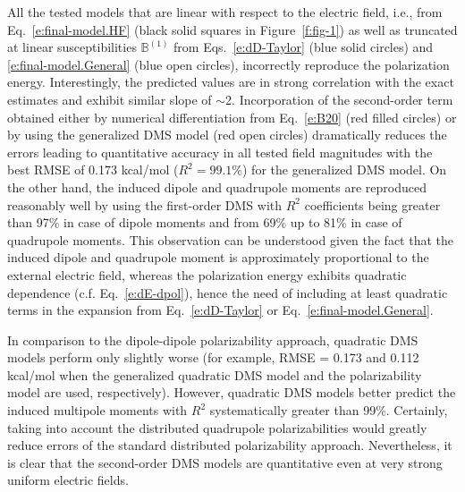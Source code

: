 \documentclass[aip,jcp,preprint,amsmath,amssymb,floatfix]{revtex4-1}
\begin{document}
All the tested models that are linear with respect to the electric field,
i.e., from Eq.~\eqref{e:final-model.HF} (black solid squares in Figure~\ref{f:fig-1}) 
as well as truncated at linear susceptibilities $\mathbb{B}^{(1)}$ 
from Eqs.~\eqref{e:dD-Taylor} (blue solid circles) and \eqref{e:final-model.General} (blue open circles),
incorrectly reproduce the polarization energy.
Interestingly, the predicted values are in strong
correlation with the exact estimates and exhibit similar slope of $\sim$2.
Incorporation of the second\hyp{}order term
obtained either by numerical differentiation from Eq.~\eqref{e:B20} (red filled circles) 
or by using the generalized DMS model (red open circles)
dramatically reduces the errors
leading to quantitative accuracy in all tested field magnitudes 
with the best RMSE of 0.173 kcal/mol ($R^2=99.1\%$) for the generalized DMS model.
On the other hand, the
induced dipole and quadrupole moments are reproduced reasonably well by
using the first\hyp{}order DMS with $R^2$ coefficients being 
greater than 97\% in case of dipole moments and from 69\% up to 81\% in case of quadrupole moments.
This observation can be understood given the fact that the induced dipole
and quadrupole moment is approximately proportional to the external electric field, whereas the polarization
energy exhibits quadratic dependence (c.f. Eq.~\eqref{e:dE-dpol}), hence the need of including at least
quadratic terms in the expansion from Eq.~\eqref{e:dD-Taylor} or Eq.~\eqref{e:final-model.General}. 

In comparison to the dipole\hyp{}dipole polarizability approach, 
quadratic DMS models perform only slightly worse 
(for example, RMSE = 0.173 and 0.112 kcal/mol when the generalized quadratic DMS
model and the polarizability model are used, respectively).
However, quadratic DMS models better predict the induced multipole moments with
$R^2$ systematically greater than 99\%. 
Certainly, taking into account the distributed quadrupole polarizabilities
would greatly reduce errors of the standard distributed polarizability approach.
Nevertheless, it is clear that the second\hyp{}order
DMS models are quantitative even at very strong uniform electric fields.
\end{document}
